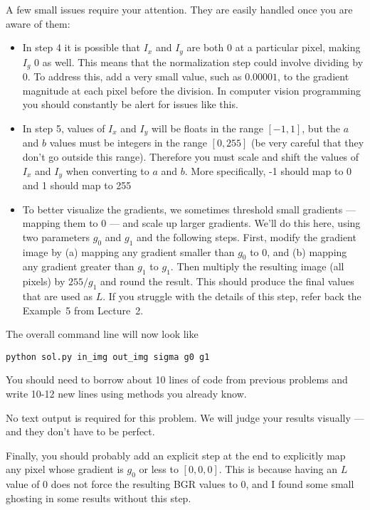 \documentclass[11pt]{article}
\begin{document}
A few small issues require your attention. They are easily handled
once you are aware of them:
\begin{itemize}
\item In step 4 it is possible that $I_x$ and $I_y$ are both 0 at a
  particular pixel, making $I_g$ 0 as well.  This means that the
  normalization step could involve dividing by 0. To address this, add
  a very small value, such as $0.00001$, to the gradient magnitude at
  each pixel before the division. In computer vision programming you
  should constantly be alert for issues like this.
\item In step 5, values of $I_x$ and $I_y$ will be floats in the range
  $[-1,1]$, but the $a$ and $b$ values must be integers in the range
  $[0,255]$ (be very careful that they don't go outside this range).
  Therefore you must scale and shift the values of $I_x$ 
  and $I_y$ when converting to $a$ and $b$. More specifically, -1
  should map to 0 and 1 should map to 255
\item To better visualize the gradients, we sometimes threshold small
  gradients --- mapping them to 0 --- and scale up larger gradients. We'll
  do this here, using two parameters $g_0$ and $g_1$ and the following
  steps. First, modify the gradient image by (a) mapping any gradient
  smaller than $g_0$ to 0, and (b) mapping any gradient greater than
  $g_1$ to $g_1$.  Then multiply the resulting image (all pixels) by
  $255 / g_1$ and round the result.  This should produce the final
  values that are used as $L$. If you struggle with the details
  of this step, refer back the Example~5 from Lecture~2.
\end{itemize}

The overall command line will now look like
\begin{verbatim}
python sol.py in_img out_img sigma g0 g1
\end{verbatim}
You should need to borrow about 10 lines of code from previous
problems and write 10-12 new lines using methods you already
know.

No text output is required for this problem. We will judge your
results visually --- and they don't have to be perfect.

Finally, you should probably add an explicit step at the end to
explicitly map any pixel whose gradient is $g_0$ or less to $[0, 0,
0]$. This is because having an $L$ value of 0 does not force the
resulting BGR values to 0, and I found some small ghosting in some
results without this step.
\end{document}
